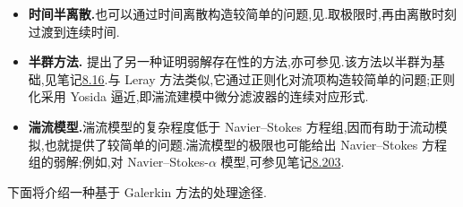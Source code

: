 \begin{note}[较简单问题的构造方式]
\begin{itemize}
  \item \textbf{时间半离散.}也可以通过时间离散构造较简单的问题,见\textcite[第 III.4 章]{Temam1984}.取极限时,再由离散时刻过渡到连续时间.

  \item \textbf{半群方法.}\textcite{Sohr1983} 提出了另一种证明弱解存在性的方法,亦可参见\textcite{Sohr2001}.该方法以半群为基础,见笔记\hyperref[note:semigroup-method]{8.16}.与 Leray 方法类似,它通过正则化对流项构造较简单的问题;正则化采用 Yosida 逼近,即湍流建模中微分滤波器的连续对应形式.

  \item \textbf{湍流模型.}湍流模型的复杂程度低于 Navier--Stokes 方程组,因而有助于流动模拟,也就提供了较简单的问题.湍流模型的极限也可能给出 Navier--Stokes 方程组的弱解;例如,对 Navier--Stokes-$\alpha$ 模型,可参见笔记\hyperref[note:navier-stokes-alpha-model]{8.203}.
\end{itemize}
下面将介绍一种基于 Galerkin 方法的处理途径.
\end{note}

